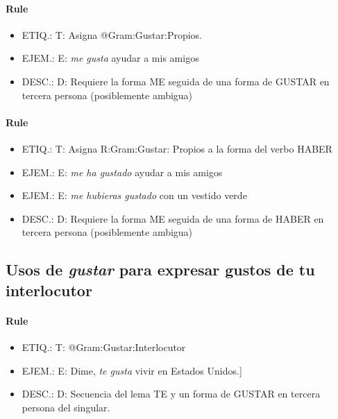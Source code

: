 \documentclass[11pt]{report}
\begin{document}
\paragraph*{Rule}
\begin{itemize}
\item ETIQ.:  T: Asigna @Gram:Gustar:Propios.
\item EJEM.:  E: \emph{me gusta} ayudar a mis amigos 
\item DESC.:  D: Requiere la forma ME seguida de una forma de GUSTAR en tercera persona (posiblemente ambigua)
\end{itemize}

\paragraph*{Rule}
\begin{itemize}
\item ETIQ.:  T: Asigna R:Gram:Gustar: Propios a la forma del verbo HABER
\item EJEM.:  E: \emph{me ha gustado} ayudar a mis amigos 
\item EJEM.:  E: \emph{me hubieras gustado} con un vestido verde 
\item DESC.:  D: Requiere la forma ME seguida de una forma de HABER en tercera persona (posiblemente ambigua)
\end{itemize}

\subsection{Usos de \emph{gustar} para expresar gustos de tu interlocutor}
\paragraph*{Rule}
\begin{itemize}
\item ETIQ.:  T: @Gram:Gustar:Interlocutor
\item EJEM.:  E: Dime, \emph{te gusta} vivir en Estados Unidos.] 
\item DESC.:  D: Secuencia del lema TE y un forma de GUSTAR en tercera persona del singular.
\end{itemize}
\end{document}
